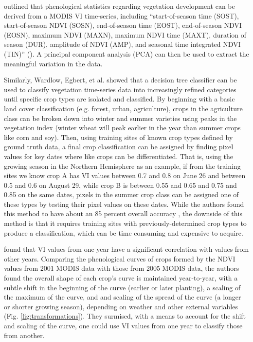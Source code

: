 \citeauthor{gu2010phenological} outlined that phenological statistics regarding vegetation development can be derived from a MODIS VI time-series, including “start-of-season time (SOST), start-of-season NDVI (SOSN), end-of-season time (EOST), end-of-season NDVI (EOSN), maximum NDVI (MAXN), maximum NDVI time (MAXT), duration of season (DUR), amplitude of NDVI (AMP), and seasonal time integrated NDVI (TIN)” \mkbibparens{\citeyear[529]{gu2010phenological}}. A principal component analysis (PCA) can then be used to extract the meaningful variation in the data.

Similarly, Wardlow, Egbert, et al. \autocites{wardlow2002discriminating}{wardlow2005state-level}{wardlow2007analysis}{wardlow2008large-area} showed that a decision tree classifier can be used to classify vegetation time-series data into increasingly refined categories until specific crop types are isolated and classified. By beginning with a basic land cover classification (e.g. forest, urban, agriculture), crops in the agriculture class can be broken down into winter and summer varieties using peaks in the vegetation index (winter wheat will peak earlier in the year than summer crops like corn and soy). Then, using training sites of known crop types defined by ground truth data, a final crop classification can be assigned by finding pixel values for key dates where like crops can be differentiated. That is, using the growing season in the Northern Hemisphere as an example, if from the training sites we know crop A has VI values between 0.7 and 0.8 on June 26 and between 0.5 and 0.6 on August 29, while crop B is between 0.55 and 0.65 and 0.75 and 0.85 on the same dates, pixels in the summer crop class can be assigned one of these types by testing their pixel values on these dates. While the authors found this method to have about an 85 percent overall accuracy \autocite{wardlow2005state-level}, the downside of this method is that it requires training sites with previously-determined crop types to produce a classification, which can be time consuming and expensive to acquire.

\textcite{masialeti2010a-comparative} found that VI values from one year have a significant correlation with values from other years. Comparing the phenological curves of crops formed by the NDVI values from 2001 MODIS data \autocite[from][]{wardlow2005state-level} with those from 2005 MODIS data, the authors found the overall shape of each crop's curve is maintained year-to-year, with a subtle shift in the beginning of the curve (earlier or later planting), a scaling of the maximum of the curve, and and scaling of the spread of the curve (a longer or shorter growing season), depending on weather and other external variables (Fig. \ref{fig:transformations}). They surmised, with a means to account for the shift and scaling of the curve, one could use VI values from one year to classify those from another.

